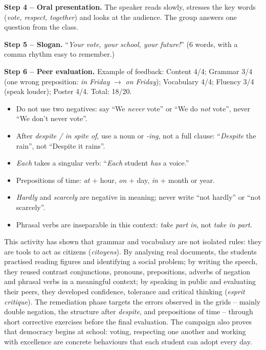 \documentclass[11pt]{article}
\newcounter{popsec}
\newcounter{popsub}
\newcommand{\courssub}[1]{%
  \stepcounter{popsub}%
  \par\vspace{9pt}\noindent{\popxbold\fontsize{11.5}{13}\selectfont\color{popink}{\color{poporange}\thepopsec.\thepopsub}\hspace{6pt}#1}\par\nopagebreak\vspace{4pt}
}
\begin{document}
\begin{exoresolu}
\textbf{Step 4 -- Oral presentation.} The speaker reads slowly, stresses the key words (\emph{vote, respect, together}) and looks at the audience. The group answers one question from the class.

\textbf{Step 5 -- Slogan.} ``\emph{Your vote, your school, your future!}'' (6 words, with a comma rhythm easy to remember.)

\textbf{Step 6 -- Peer evaluation.} Example of feedback: Content 4/4; Grammar 3/4 (one wrong preposition: \emph{in Friday} $\rightarrow$ \emph{on Friday}); Vocabulary 4/4; Fluency 3/4 (speak louder); Poster 4/4. Total: 18/20.
\end{exoresolu}

\begin{attention}
\begin{itemize}
\item Do not use two negatives: say ``We \emph{never} vote'' or ``We do \emph{not} vote'', never ``We don't never vote''.
\item After \emph{despite / in spite of}, use a noun or \emph{-ing}, not a full clause: ``\emph{Despite} the rain'', not ``Despite it rains''.
\item \emph{Each} takes a singular verb: ``\emph{Each} student \emph{has} a voice.''
\item Prepositions of time: \emph{at} + hour, \emph{on} + day, \emph{in} + month or year.
\item \emph{Hardly} and \emph{scarcely} are negative in meaning; never write ``not hardly'' or ``not scarcely''.
\item Phrasal verbs are inseparable in this context: \emph{take part in}, not \emph{take in part}.
\end{itemize}
\end{attention}

\courssub{Bilan de l'activité}

This activity has shown that grammar and vocabulary are not isolated rules: they are tools to act as citizens (\emph{citoyens}). By analysing real documents, the students practised reading figures and identifying a social problem; by writing the speech, they reused contrast conjunctions, pronouns, prepositions, adverbs of negation and phrasal verbs in a meaningful context; by speaking in public and evaluating their peers, they developed confidence, tolerance and critical thinking (\emph{esprit critique}). The remediation phase targets the errors observed in the grids -- mainly double negation, the structure after \emph{despite}, and prepositions of time -- through short corrective exercises before the final evaluation. The campaign also proves that democracy begins at school: voting, respecting one another and working with excellence are concrete behaviours that each student can adopt every day.
\end{document}
